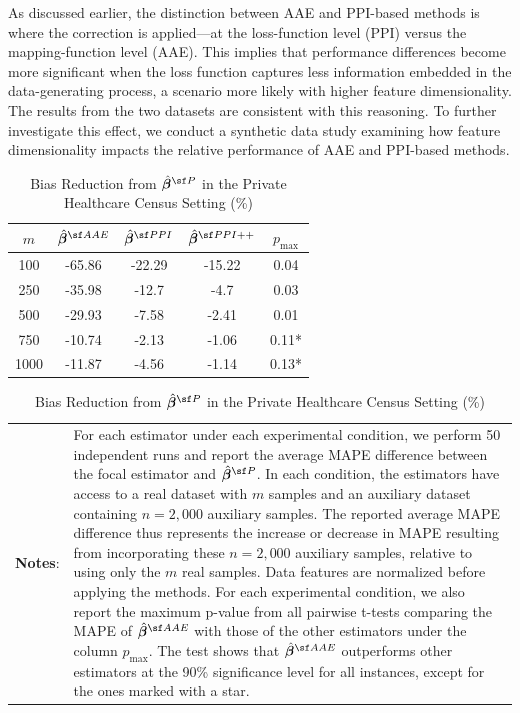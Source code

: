 As discussed earlier, the distinction between AAE and PPI-based methods is where the correction is applied—at the loss-function level (PPI) versus the mapping-function level (AAE). This implies that performance differences become more significant when the loss function captures less information embedded in the data-generating process, a scenario more likely with higher feature dimensionality. The results from the two datasets are consistent with this reasoning. To further investigate this effect, we conduct a synthetic data study examining how feature dimensionality impacts the relative performance of AAE and PPI-based methods.

\begin{table}[!ht]
\renewcommand{\arraystretch}{1.3}
\centering
{\footnotesize 
\caption{Bias Reduction from $\hat{\betavec}^{\sf P}$ in the Private Healthcare Census Setting (\%)}
\label{tab:aae-ppi-census}
\begin{tabular}{ccccc}\hline\hline
$m$  & $\hat{\betavec}^{\sf AAE}$    & $\hat{\betavec}^{\sf PPI}$    & $\hat{\betavec}^{\sf PPI++}$ & $p_{\max}$ \\\hline
100  & -65.86 & -22.29 & -15.22 & 0.04       \\
250  & -35.98 & -12.7  & -4.7   & 0.03       \\
500  & -29.93 & -7.58  & -2.41  & 0.01       \\
750  & -10.74 & -2.13  & -1.06  & 0.11*       \\
1000 & -11.87 & -4.56  & -1.14  & 0.13*   \\\hline\hline
\end{tabular}
\begin{minipage}{15.5cm}
\vspace{3pt}
    \footnotesize 
    \begin{tabular}{p{1cm} p{13cm}}
         \textbf{Notes}: & \setlength{\baselineskip}{1.2\baselineskip} For each estimator under each experimental condition, we perform 50 independent runs and report the average MAPE difference between the focal estimator and $\hat{\betavec}^{\sf P}$. In each condition, the estimators have access to a real dataset with $m$ samples and an auxiliary dataset containing $n = 2{,}000$ auxiliary samples. The reported average MAPE difference thus represents the increase or decrease in MAPE resulting from incorporating these $n = 2{,}000$ auxiliary samples, relative to using only the $m$ real samples. Data features are normalized before applying the methods. For each experimental condition, we also report the maximum p-value from all pairwise t-tests comparing the MAPE of $\hat{\betavec}^{\sf AAE}$ with those of the other estimators under the column $p_{\max}$. The test shows that $\hat{\betavec}^{\sf AAE}$ outperforms other estimators at the 90\% significance level for all instances, except for the ones marked with a star.      

\end{tabular}
\end{minipage}}
\end{table}
